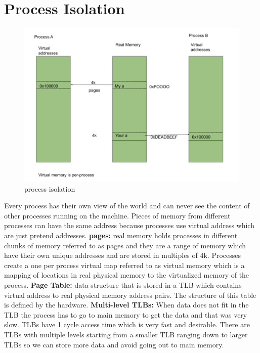 \documentclass[twoside]{article}
\begin{document}
\section{Process Isolation}
\begin{figure}[h!]
  \includegraphics[width=\linewidth]{fig8.png}
  \caption{process isolation}
  \label{fig:fig8}
\end{figure}
Every process has their own view of the world and can never see the content of other processes running on the machine. Pieces of memory from different processes can have the same address because processes use virtual address which are just pretend addresses. 
\newline
\textbf{pages:} real memory holds processes in different chunks of memory referred to as pages and they are a range of memory which have their own unique addresses and are stored in multiples of 4k.   
\newline
Processes create a one per process virtual map referred to as virtual memory which is a mapping of locations in real physical memory to the virtualized memory of the process.  
\newline
\textbf{Page Table:} data structure that is stored in a TLB which contains virtual address to real physical memory address pairs. The structure of this table is defined by the hardware.
\newline
\textbf{Multi-level TLBs:} When data does not fit in the TLB the process has to go to main memory to get the data and that was very slow. TLBs have 1 cycle access time which is very fast and desirable. There are TLBs with multiple levels starting from a smaller TLB ranging down to larger TLBs so we can store more data and avoid going out to main memory. 
\end{document}

